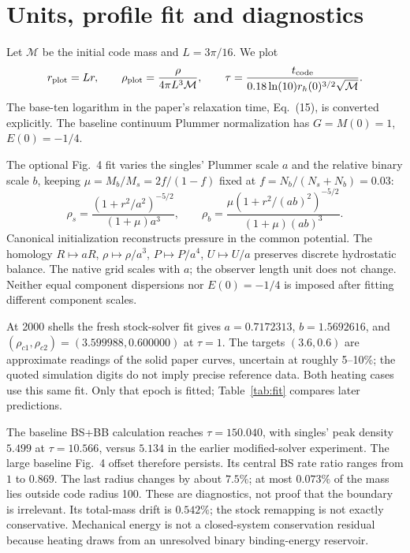 \documentclass[11pt]{article}
\begin{document}
\section{Units, profile fit and diagnostics}
Let $\mathcal M$ be the initial code mass and $L=3\pi/16$. We plot
\begin{equation}
 r_{\rm plot}=Lr,\qquad
 \rho_{\rm plot}=\frac{\rho}{4\pi L^3\mathcal M},\qquad
 \tau=\frac{t_{\rm code}}{0.18\ln(10)r_h(0)^{3/2}\sqrt{\mathcal M}}.
\end{equation}
The base-ten logarithm in the paper's relaxation time, Eq.~(15), is
converted explicitly. The baseline continuum Plummer normalization has
$G=M(0)=1$, $E(0)=-1/4$.

The optional Fig.~4 fit varies the singles' Plummer scale $a$ and the
relative binary scale $b$, keeping $\mu=M_b/M_s=2f/(1-f)$ fixed at
$f=N_b/(N_s+N_b)=0.03$:
\begin{equation}
 \rho_s=\frac{(1+r^2/a^2)^{-5/2}}{(1+\mu)a^3},\qquad
 \rho_b=\frac{\mu(1+r^2/(ab)^2)^{-5/2}}{(1+\mu)(ab)^3}.
\end{equation}
Canonical initialization reconstructs pressure in the common potential.
The homology $R\mapsto aR$, $\rho\mapsto\rho/a^3$,
$P\mapsto P/a^4$, $U\mapsto U/a$ preserves discrete hydrostatic balance.
The native grid scales with $a$; the observer length unit does not change.
Neither equal component dispersions nor $E(0)=-1/4$ is imposed after
fitting different component scales.

At 2000 shells the fresh stock-solver fit gives
$a=0.7172313$, $b=1.5692616$, and
$(\rho_{c1},\rho_{c2})=(3.599988,0.600000)$ at $\tau=1$.
The targets $(3.6,0.6)$ are approximate readings of the solid paper
curves, uncertain at roughly 5--10\%; the quoted simulation digits do
not imply precise reference data. Both heating cases use this same fit.
Only that epoch is fitted; Table~\ref{tab:fit} compares later predictions.
\begin{table}[ht]
 \centering
 
 \caption{BS+BB central densities. Only the $\tau=1$ row constrains the fit.}
 \label{tab:fit}
\end{table}

The baseline BS+BB calculation reaches $\tau=150.040$, with singles'
peak density $5.499$ at $\tau=10.566$, versus $5.134$ in the earlier
modified-solver experiment. The large baseline Fig.~4 offset therefore
persists. Its central BS rate ratio ranges from $1$ to $0.869$.
The last radius changes by about $7.5\%$; at most $0.073\%$ of the mass
lies outside code radius 100. These are diagnostics, not proof that
the boundary is irrelevant. Its total-mass drift is $0.542\%$; the
stock remapping is not exactly conservative. Mechanical energy is not
a closed-system conservation residual because heating draws from an
unresolved binary binding-energy reservoir.
\end{document}
